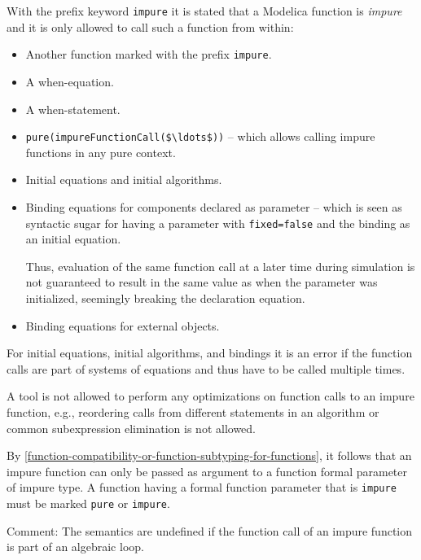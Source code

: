 With the prefix keyword \lstinline!impure! it is stated that a Modelica function is \emph{impure} and it is only allowed to call such a function from within:
\begin{itemize}
\item
  Another function marked with the prefix \lstinline!impure!.
\item
  A when-equation.
\item
  A when-statement.
\item
  \lstinline!pure(impureFunctionCall($\ldots$))! -- which allows calling impure functions in any pure context.
\item
  Initial equations and initial algorithms.
\item
  Binding equations for components declared as parameter -- which is seen as syntactic sugar for having a parameter with \lstinline!fixed=false! and the binding as an initial equation.
  \begin{nonnormative}
  Thus, evaluation of the same function call at a later time during simulation is not guaranteed to result in the same value as when the parameter
  was initialized, seemingly breaking the declaration equation.
  \end{nonnormative}
\item
  Binding equations for external objects.
\end{itemize}

For initial equations, initial algorithms, and bindings it is an error
if the function calls are part of systems of equations and thus have to
be called multiple times.

\begin{nonnormative}
A tool is not allowed to perform any optimizations on function
calls to an impure function, e.g., reordering calls from different
statements in an algorithm or common subexpression elimination is not
allowed.
\end{nonnormative}

By \cref{function-compatibility-or-function-subtyping-for-functions}, it follows that an impure function can only be passed as argument to a function formal parameter of impure type.
A function having a formal function parameter that is \lstinline!impure! must be marked \lstinline!pure! or \lstinline!impure!.

\begin{nonnormative}
Comment: The semantics are undefined if the function call of an
impure function is part of an algebraic loop.
\end{nonnormative}

